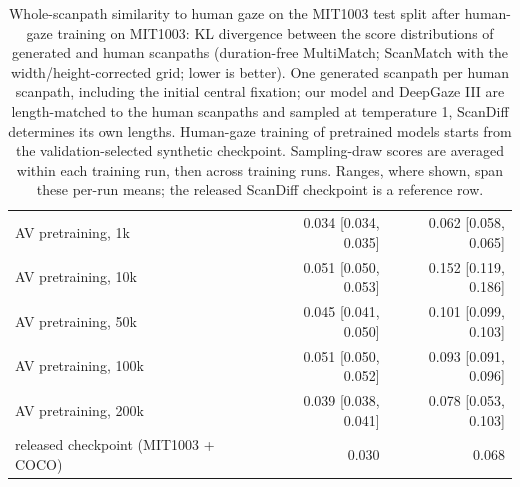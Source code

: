 \begin{table}[t]
\begin{tabular}{lrr}
    AV pretraining, 1k & 0.034 \scriptsize[0.034, 0.035] & 0.062 \scriptsize[0.058, 0.065] \\
    AV pretraining, 10k & 0.051 \scriptsize[0.050, 0.053] & 0.152 \scriptsize[0.119, 0.186] \\
    AV pretraining, 50k & 0.045 \scriptsize[0.041, 0.050] & 0.101 \scriptsize[0.099, 0.103] \\
    AV pretraining, 100k & 0.051 \scriptsize[0.050, 0.052] & 0.093 \scriptsize[0.091, 0.096] \\
    AV pretraining, 200k & 0.039 \scriptsize[0.038, 0.041] & 0.078 \scriptsize[0.053, 0.103] \\
    \midrule
    released checkpoint (MIT1003 + COCO) & 0.030 & 0.068 \\
    \bottomrule
  \end{tabular}
  \caption{Whole-scanpath similarity to human gaze on the MIT1003 test split after human-gaze training on MIT1003: KL divergence between the score distributions of generated and human scanpaths (duration-free MultiMatch; ScanMatch with the width/height-corrected grid; lower is better). One generated scanpath per human scanpath, including the initial central fixation; our model and DeepGaze III are length-matched to the human scanpaths and sampled at temperature 1, ScanDiff determines its own lengths. Human-gaze training of pretrained models starts from the validation-selected synthetic checkpoint. Sampling-draw scores are averaged within each training run, then across training runs. Ranges, where shown, span these per-run means; the released ScanDiff checkpoint is a reference row.}
  \label{tab:xfam}
\end{table}

